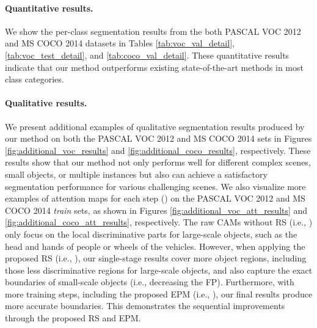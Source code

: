 \documentclass[11pt]{article}
\begin{document}
\paragraph{Quantitative results.} We show the per-class segmentation results from the both PASCAL VOC 2012 and MS COCO 2014 datasets in Tables \ref{tab:voc_val_detail}, \ref{tab:voc_test_detail}, and \ref{tab:coco_val_detail}. These quantitative results indicate that our method outperforms existing state-of-the-art methods in most class categories. 

\paragraph{Qualitative results.}  We present additional examples of qualitative segmentation results produced by our method on both the PASCAL VOC 2012 and MS COCO 2014  sets in Figures \ref{fig:additional_voc_results} and \ref{fig:additional_coco_results}, respectively. These results show that our method not only performs well for different complex scenes, small objects, or multiple instances but also can achieve a satisfactory segmentation performance for various challenging scenes. We also visualize more examples of attention maps for each step () on the PASCAL VOC 2012 and MS COCO 2014 \emph{train} sets, as shown in Figures \ref{fig:additional_voc_att_results} and \ref{fig:additional_coco_att_results}, respectively. The raw CAMs without RS (i.e., ) only focus on the local discriminative parts for large-scale objects, such as the head and hands of people or wheels of the vehicles. However, when applying the proposed RS (i.e., ), our single-stage results cover more object regions, including those less discriminative regions for large-scale objects, and also capture the exact boundaries of small-scale objects (i.e., decreasing the FP). Furthermore, with more training steps, including the proposed EPM (i.e., ), our final results produce more accurate boundaries. This demonstrates the sequential improvements through the proposed RS and EPM.

\clearpage
\end{document}
